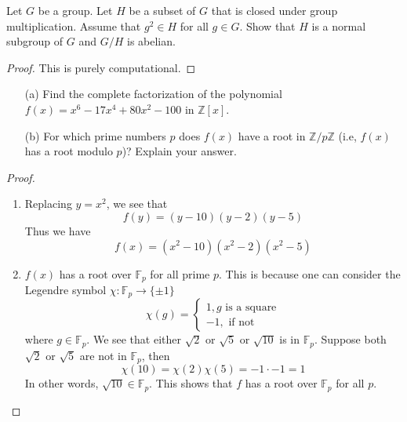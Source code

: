 \documentclass[openany]{book}
\newcommand{\F}{\mathbb{F}}
\begin{document}


\begin{prob}
    Let \(G\) be a group. Let \(H\) be a subset of \(G\) that is closed under group multiplication. Assume that \(g^2 \in H\) for all \(g \in G\). Show that \(H\) is a normal subgroup of \(G\) and \(G/H\) is abelian.
\end{prob}
\begin{proof}
    This is purely computational. 
\end{proof}

\begin{prob}
    \begin{itemize}
        \item[(a)] Find the complete factorization of the polynomial \(f(x) = x^6 - 17x^4 + 80x^2 - 100\) in \(\mathbb{Z}[x]\).
        \item[(b)] For which prime numbers \(p\) does \(f(x)\) have a root in \(\mathbb{Z}/p\mathbb{Z}\) (i.e, \(f(x)\) has a root modulo \(p\))? Explain your answer.
    \end{itemize}
\end{prob}
\begin{proof}
    \begin{enumerate}
        \item Replacing $y=x^2$, we see that 
        \begin{equation*}
            f(y)=(y-10)(y-2)(y-5)
        \end{equation*}
        Thus we have 
        \begin{equation*}
            f(x)=(x^2-10)(x^2-2)(x^2-5)
        \end{equation*}
        \item $f(x)$ has a root over $\F_p$ for all prime $p$. This is because one can consider the Legendre symbol $\chi:\F_p\to\{\pm1\}$
        \begin{equation*}
            \chi(g)=\begin{cases}
                1, g \text{ is a square}\\
                -1, \text{ if not}
            \end{cases}
        \end{equation*}
        where $g\in\F_p$. We see that either $\sqrt{2}$ or $\sqrt{5}$ or $\sqrt{10}$ is in $\F_p$. Suppose both $\sqrt{2}$ or $\sqrt{5}$ are not in $\F_p$, then 
        \begin{equation*}
            \chi(10)=\chi(2)\chi(5)=-1\cdot -1=1
        \end{equation*}
        In other words, $\sqrt{10}\in\F_p$. This shows that $f$ has a root over $\F_p$ for all $p$.
    \end{enumerate}
\end{proof}
\end{document}
